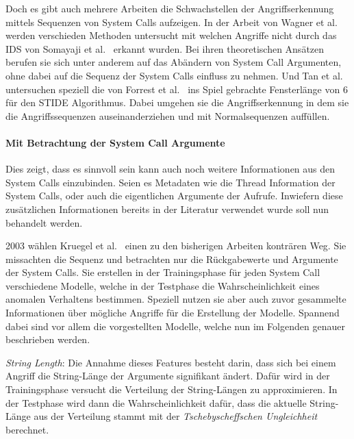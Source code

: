             Doch es gibt auch mehrere Arbeiten die Schwachstellen der Angriffserkennung mittels Sequenzen von System Calls aufzeigen.
            In der Arbeit von Wagner et al.~\cite{Syscallseqexploit1} werden verschieden Methoden untersucht mit welchen Angriffe nicht durch das IDS von Somayaji et al.~\cite{FORREST2000} erkannt wurden.
            Bei ihren theoretischen Ansätzen berufen sie sich unter anderem auf das Abändern von System Call Argumenten, ohne dabei auf die Sequenz der System Calls einfluss zu nehmen.
            UndTan et al.~\cite{Syscallseqexploit3} untersuchen speziell die von Forrest et al.~\cite{FORREST} ins Spiel gebrachte Fensterlänge von $6$ für den \ac{STIDE} Algorithmus.
            Dabei umgehen sie die Angriffserkennung in dem sie die Angriffssequenzen auseinanderziehen und mit Normalsequenzen auffüllen.


        \paragraph{Mit Betrachtung der System Call Argumente}\label{sec:related_sys_arg}
            Dies zeigt, dass es sinnvoll sein kann auch noch weitere Informationen aus den System Calls einzubinden.
            Seien es Metadaten wie die Thread Information der System Calls, oder auch die eigentlichen Argumente der Aufrufe.
            Inwiefern diese zusätzlichen Informationen bereits in der Literatur verwendet wurde soll nun behandelt werden.

            2003 wählen Kruegel et al.~\cite{ARGUMENTS} einen zu den bisherigen Arbeiten konträren Weg.
            Sie missachten die Sequenz und betrachten nur die Rückgabewerte und Argumente der System Calls.
            Sie erstellen in der Trainingsphase für jeden System Call verschiedene Modelle, welche in der Testphase die Wahrscheinlichkeit eines anomalen Verhaltens bestimmen.
            Speziell nutzen sie aber auch zuvor gesammelte Informationen über mögliche Angriffe für die Erstellung der Modelle.
            Spannend dabei sind vor allem die vorgestellten Modelle, welche nun im Folgenden genauer beschrieben werden.

            \textit{String Length}: Die Annahme dieses Features besteht darin, dass sich bei einem Angriff die String-Länge der Argumente signifikant ändert.
            Dafür wird in der Trainingsphase versucht die Verteilung der String-Längen zu approximieren.
            In der Testphase wird dann die Wahrscheinlichkeit dafür, dass die aktuelle String-Länge aus der Verteilung stammt mit der \textit{Tschebyscheffschen Ungleichheit} berechnet.
            
